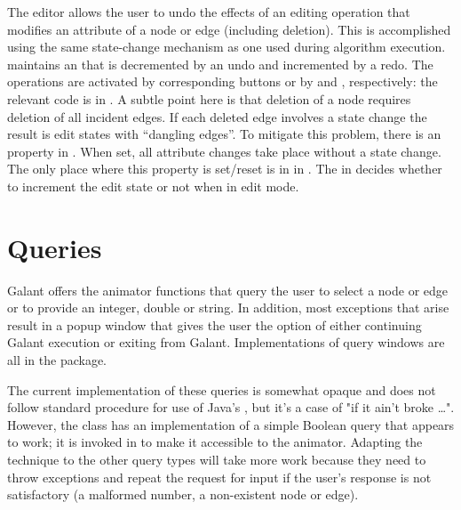 The editor allows the user to undo the effects of an editing operation that
modifies an attribute of a node or edge (including deletion). This is
accomplished using the same state-change mechanism as one used during
algorithm execution.  maintains an  that
is decremented by an undo and incremented by a redo. The operations are
activated by corresponding buttons or by  and ,
respectively: the relevant code is in .
A subtle point here is that deletion of a node requires deletion of all
incident edges. If each deleted edge involves a state change the result is
edit states with ``dangling edges''. To mitigate this problem, there is an
 property in . When set, all attribute
changes take place without a state change. The only place where this property
is set/reset is in  in . The
 in 
decides whether to increment the edit state or not when in edit mode.

\section{Queries} \label{sec:queries}

Galant offers the animator functions that query the user to select a node or
edge or to provide an integer, double or string. In addition, most exceptions
that arise result in a popup window that gives the user the option of either
continuing Galant execution or exiting from Galant.
Implementations of query windows are all in the  package.

The current implementation of these queries is somewhat opaque and does not
follow standard procedure for use of Java's , but it's a
case of "if it ain't broke \ldots".
However, the class  has an implementation of a simple
Boolean query that appears to work; it is invoked in  to make
it accessible to the animator.
Adapting the technique to the other query types will take more work because
they need to throw exceptions and repeat the request for input if the user's
response is not satisfactory (a malformed number, a non-existent node or edge).

